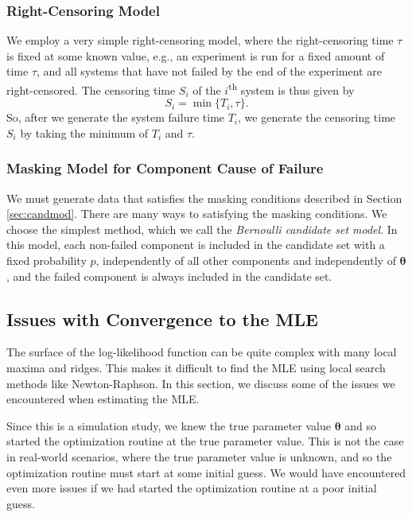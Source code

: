 \documentclass[
]{article}
\begin{document}
\hypertarget{right-censoring-model}{%
\subsubsection*{Right-Censoring Model}\label{right-censoring-model}}

We employ a very simple right-censoring model, where the right-censoring
time \(\tau\) is fixed at some known value, e.g., an experiment is run
for a fixed amount of time \(\tau\), and all systems that have not
failed by the end of the experiment are right-censored. The censoring
time \(S_i\) of the \(i\)\textsuperscript{th} system is thus given by \[
    S_i = \min\{T_i, \tau\}.
\] So, after we generate the system failure time \(T_i\), we generate
the censoring time \(S_i\) by taking the minimum of \(T_i\) and
\(\tau\).

\hypertarget{masking-model-for-component-cause-of-failure}{%
\subsubsection*{Masking Model for Component Cause of
Failure}\label{masking-model-for-component-cause-of-failure}}

We must generate data that satisfies the masking conditions described in
Section \ref{sec:candmod}. There are many ways to satisfying the masking
conditions. We choose the simplest method, which we call the
\emph{Bernoulli candidate set model}. In this model, each non-failed
component is included in the candidate set with a fixed probability
\(p\), independently of all other components and independently of
\(\boldsymbol{\theta}\), and the failed component is always included in
the candidate set.

\hypertarget{sec:opt_rescale}{%
\subsection{Issues with Convergence to the MLE}\label{sec:opt_rescale}}

The surface of the log-likelihood function can be quite complex with
many local maxima and ridges. This makes it difficult to find the MLE
using local search methods like Newton-Raphson. In this section, we
discuss some of the issues we encountered when estimating the MLE.

Since this is a simulation study, we knew the true parameter value
\(\boldsymbol{\theta}\) and so started the optimization routine at the
true parameter value. This is not the case in real-world scenarios,
where the true parameter value is unknown, and so the optimization
routine must start at some initial guess. We would have encountered even
more issues if we had started the optimization routine at a poor initial
guess.
\end{document}
